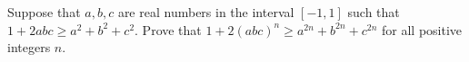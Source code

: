 Suppose that $a,b,c$ are real numbers in the interval $[-1,1]$ such that $1 + 2abc \geq a^2+b^2+c^2$. Prove that
$1+2(abc)^n \geq a^{2n} + b^{2n} + c^{2n}$ for all positive integers $n$.